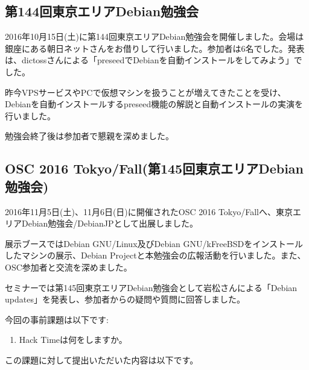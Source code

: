 \documentclass[mingoth,a4paper]{jsarticle}
\begin{document}

\subsection{第144回東京エリアDebian勉強会}

2016年10月15日(土)に第144回東京エリアDebian勉強会を開催しました。会場は銀座にある朝日ネットさんをお借りして行いました。参加者は6名でした。発表は、dictossさんによる「preseedでDebianを自動インストールをしてみよう」でした。

昨今VPSサービスやPCで仮想マシンを扱うことが増えてきたことを受け、Debianを自動インストールするpreseed機能の解説と自動インストールの実演を行いました。

勉強会終了後は参加者で懇親を深めました。

\subsection{OSC 2016 Tokyo/Fall(第145回東京エリアDebian勉強会)}

2016年11月5日(土)、11月6日(日)に開催されたOSC 2016 Tokyo/Fallへ、東京エリアDebian勉強会/DebianJPとして出展しました。

展示ブースではDebian GNU/Linux及びDebian GNU/kFreeBSDをインストールしたマシンの展示、Debian Projectと本勉強会の広報活動を行いました。また、OSC参加者と交流を深めました。

セミナーでは第145回東京エリアDebian勉強会として岩松さんによる「Debian updates」を発表し、参加者からの疑問や質問に回答しました。


今回の事前課題は以下です:
\begin{enumerate}
  \item Hack Timeは何をしますか。
\end{enumerate}
この課題に対して提出いただいた内容は以下です。
\begin{multicols}{2}
{\small

}
\end{multicols}

%
%
%
%
\end{document}

